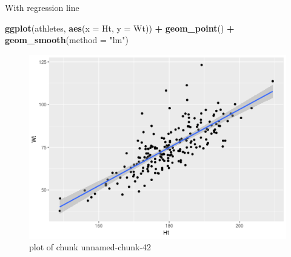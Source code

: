 \documentclass[ignorenonframetext,]{beamer}
\newenvironment{Shaded}{\begin{snugshade}}{\end{snugshade}}
\newcommand{\DataTypeTok}[1]{\textcolor[rgb]{0.13,0.29,0.53}{#1}}
\newcommand{\KeywordTok}[1]{\textcolor[rgb]{0.13,0.29,0.53}{\textbf{#1}}}
\newcommand{\NormalTok}[1]{#1}
\newcommand{\OperatorTok}[1]{\textcolor[rgb]{0.81,0.36,0.00}{\textbf{#1}}}
\newcommand{\StringTok}[1]{\textcolor[rgb]{0.31,0.60,0.02}{#1}}
\begin{document}
\begin{frame}[fragile]{With regression line}
\protect\hypertarget{with-regression-line}{}

\begin{Shaded}
\begin{Highlighting}[]
\KeywordTok{ggplot}\NormalTok{(athletes, }\KeywordTok{aes}\NormalTok{(}\DataTypeTok{x =}\NormalTok{ Ht, }\DataTypeTok{y =}\NormalTok{ Wt)) }\OperatorTok{+}
\StringTok{  }\KeywordTok{geom_point}\NormalTok{() }\OperatorTok{+}\StringTok{ }\KeywordTok{geom_smooth}\NormalTok{(}\DataTypeTok{method =} \StringTok{"lm"}\NormalTok{)}
\end{Highlighting}
\end{Shaded}

\begin{figure}
\centering
\includegraphics{figure/unnamed-chunk-42-1.png}
\caption{plot of chunk unnamed-chunk-42}
\end{figure}

\end{frame}
\end{document}
